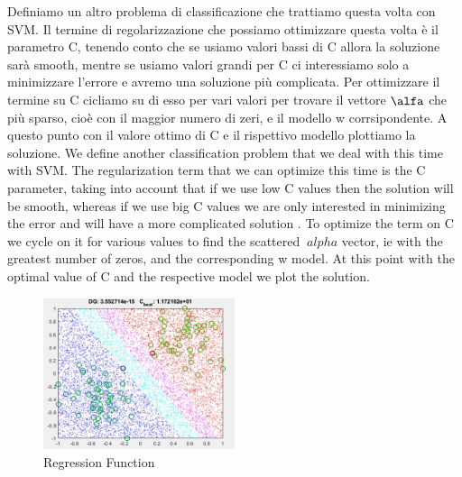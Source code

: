 
	Definiamo un altro problema di classificazione che trattiamo questa volta con SVM.
	Il termine di regolarizzazione che possiamo ottimizzare questa volta è il parametro C, tenendo conto che se usiamo valori bassi di C allora la soluzione sarà smooth, mentre se usiamo valori grandi per C ci interessiamo solo a minimizzare l'errore e avremo una soluzione più complicata.
	Per ottimizzare il termine su C cicliamo su di esso per vari valori per trovare il vettore $\alfa$ che più sparso, cioè con il maggior numero di zeri, e il modello w corrsipondente. A questo punto con il valore ottimo di C e il rispettivo modello plottiamo la soluzione.
	We define another classification problem that we deal with this time with SVM.
	The regularization term that we can optimize this time is the C parameter, taking into account that if we use low C values then the solution will be smooth, whereas if we use big C values we are only interested in minimizing the error and will have a more complicated solution .
	To optimize the term on C we cycle on it for various values to find the scattered $ \ alpha $ vector, ie with the greatest number of zeros, and the corresponding w model. At this point with the optimal value of C and the respective model we plot the solution.
	
	\begin{figure}[h]
		\centering
		\includegraphics[width=0.5\textwidth]{i2.png}
		\caption{Regression Function}
		\label{fig:regression function}
	\end{figure}
